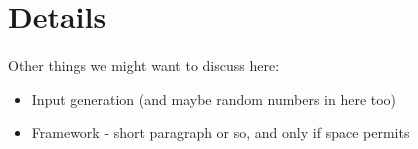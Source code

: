 \section{Details}
\label{sec:deep}



\paragraph{}
Other things we might want to discuss here:
\begin{itemize}
  \item Input generation (and maybe random numbers in here too)
  \item Framework - short paragraph or so, and only if space permits
\end{itemize}
